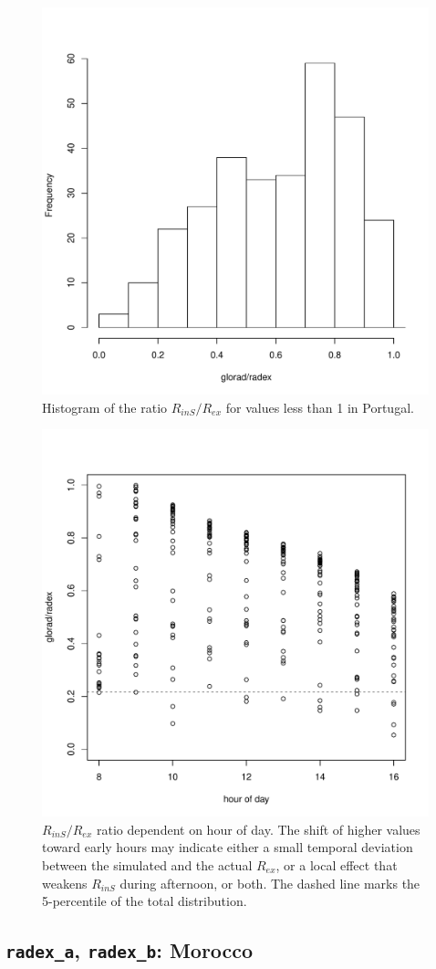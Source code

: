 \documentclass{scrreprt}
\begin{document}
\begin{figure}[ht]
  \centering
  \includegraphics[width=0.5\hsize]{./plot_radex1.pdf}
  \caption{Histogram of the ratio $R_{inS}/R_{ex}$ for values less than 1 in Portugal.}
  \label{fig:portugal_radex1}
\end{figure}

\begin{figure}[ht]
  \centering
  \includegraphics[width=0.6\hsize]{./plot_radex2.pdf}
  \caption{$R_{inS}/R_{ex}$ ratio dependent on hour of day.
           The shift of higher values toward early hours may indicate either a small temporal deviation between the simulated and the actual $R_{ex}$, or a local effect that weakens $R_{inS}$ during afternoon, or both.
           The dashed line marks the 5-percentile of the total distribution.}
  \label{fig:portugal_radex2}
\end{figure}

\subsection{\texttt{radex\_a}, \texttt{radex\_b}: Morocco} \label{ssec:parest_rad_radexmorocco}
\end{document}
